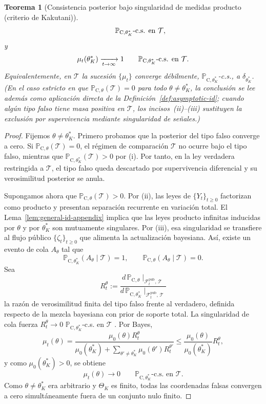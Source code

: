 \documentclass[12pt]{article}
\providecommand{\textcite}{\citet}
\newtheorem{theorem}{Teorema}[section]
\theoremstyle{definition}
\theoremstyle{remark}
\newcommand{\ProbC}[1]{\mathbb{P}_{\mathrm{C},#1}}
\newcommand{\1}{\mathbf{1}}
\begin{document}
\begin{theorem}[Consistencia posterior bajo singularidad de medidas producto \textup{(}criterio de Kakutani\textup{)}]
\[\qquad
\ProbC{\theta_K^\ast}\textup{-c.s. en }\mathcal{T},
\]
y
\[
\mu_t(\theta_K^\ast)\xrightarrow[t\to\infty]{}1
\qquad \ProbC{\theta_K^\ast}\textup{-c.s. en }\mathcal{T}.
\]
Equivalentemente, en $\mathcal{T}$ la sucesión $\{\mu_t\}$ converge débilmente, $\ProbC{\theta_K^\ast}$-c.s., a $\delta_{\theta_K^\ast}$.
\textup{(}En el caso estricto en que $\ProbC{\theta}(\mathcal{T})=0$ para todo $\theta\neq\theta_K^\ast$, la conclusión se lee además como aplicación directa de la Definición~\ref{def:asymptotic-id}; cuando algún tipo falso tiene masa positiva en $\mathcal{T}$, los incisos~\textup{(ii)}--\textup{(iii)} sustituyen la exclusión por supervivencia mediante singularidad de señales.\textup{)}
\end{theorem}

\begin{proof}
Fijemos $\theta\neq\theta_K^\ast$. Primero probamos que la posterior del tipo falso converge a cero. Si $\ProbC{\theta}(\mathcal{T})=0$, el régimen de comparación $\mathcal{T}$ no ocurre bajo el tipo falso, mientras que $\ProbC{\theta_K^\ast}(\mathcal{T})>0$ por \textup{(i)}. Por tanto, en la ley verdadera restringida a $\mathcal{T}$, el tipo falso queda descartado por supervivencia diferencial y su verosimilitud posterior se anula.

Supongamos ahora que $\ProbC{\theta}(\mathcal{T})>0$. Por \textup{(ii)}, las leyes de $\{Y_t\}_{t\ge0}$ factorizan como producto y presentan separación recurrente en variación total. El Lema~\ref{lem:general-id-appendix} implica que las leyes producto infinitas inducidas por $\theta$ y por $\theta_K^\ast$ son mutuamente singulares. Por \textup{(iii)}, esa singularidad se transfiere al flujo público $\{\zeta_t\}_{t\ge0}$ que alimenta la actualización bayesiana. Así, existe un evento de cola $A_\theta$ tal que
\[
\ProbC{\theta_K^\ast}(A_\theta\mid\mathcal{T})=1,
\qquad
\ProbC{\theta}(A_\theta\mid\mathcal{T})=0.
\]
Sea
\[
R_t^\theta
:=
\frac{d\,\ProbC{\theta}\!\mid_{\mathcal{F}_t^{\mathrm{pub}},\,\mathcal{T}}}
     {d\,\ProbC{\theta_K^\ast}\!\mid_{\mathcal{F}_t^{\mathrm{pub}},\,\mathcal{T}}}
\]
la razón de verosimilitud finita del tipo falso frente al verdadero, definida respecto de la mezcla bayesiana con prior de soporte total. La singularidad de cola fuerza $R_t^\theta\to0$ $\ProbC{\theta_K^\ast}$-c.s. en $\mathcal{T}$ \textcite{BlackwellDubins1962,Schervish1995Theory}. Por Bayes,
\[
\mu_t(\theta)
=
\frac{\mu_0(\theta)R_t^\theta}
{\mu_0(\theta_K^\ast)+\sum_{\theta'\neq\theta_K^\ast}\mu_0(\theta')R_t^{\theta'}}
\le
\frac{\mu_0(\theta)}{\mu_0(\theta_K^\ast)}R_t^\theta,
\]
y como $\mu_0(\theta_K^\ast)>0$, se obtiene
\[
\mu_t(\theta)\to0
\qquad \ProbC{\theta_K^\ast}\text{-c.s. en }\mathcal{T}.
\]
Como $\theta\neq\theta_K^\ast$ era arbitrario y $\Theta_K$ es finito, todas las coordenadas falsas convergen a cero simultáneamente fuera de un conjunto nulo finito.


\end{proof}
\end{document}
